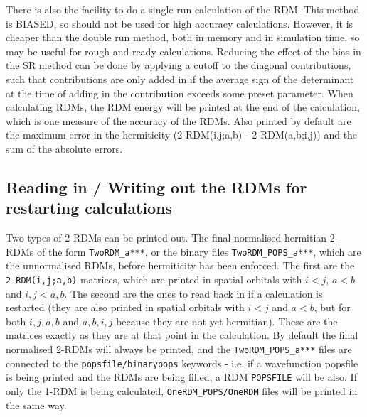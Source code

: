\documentclass[a4paper,notitlepage]{scrreprt}
\let\code\lstinline
\begin{document}
There is also the facility to do a single-run calculation of the RDM.  This method is BIASED, so should
not be used for high accuracy calculations.  However, it is cheaper than the double run method, both in
memory and in simulation time, so may be useful for rough-and-ready calculations.
Reducing the effect of the bias in the SR method can be done by applying a cutoff to the diagonal contributions, such that
contributions are only added in if the average sign of the determinant at the time of adding in the contribution exceeds
some preset parameter.
When calculating RDMs, the RDM energy will be printed at the end of the
calculation, which is one measure of the accuracy of the RDMs.  Also printed by default are the maximum error in the
    hermiticity (2-RDM(i,j;a,b) - 2-RDM(a,b;i,j)) and the sum of the absolute errors.

\subsection{Reading in / Writing out the RDMs for restarting calculations}

	Two types of 2-RDMs can be printed out.  The final normalised hermitian 2-RDMs of the form \code{TwoRDM_a***}, or the
	binary files \code{TwoRDM_POPS_a***}, which are the unnormalised RDMs, before hermiticity has been enforced.  The
	first are the \code{2-RDM(i,j;a,b)} matrices, which are printed in
    spatial orbitals with $i<j$, $a<b$ and $i,j<a,b$.  The second are the ones to read back in if a calculation
    is restarted (they are also printed in spatial orbitals with $i<j$ and $a<b$, but for both $i,j,a,b$ and $a,b,i,j$
    because they are not yet hermitian).  These are the matrices exactly as they are at that point in the calculation.
	By default the final normalised 2-RDMs will always be printed, and the \code{TwoRDM_POPS_a***} files are connected to the
    \code{popsfile/binarypops} keywords - i.e. if a wavefunction popsfile is being printed and the RDMs are being filled,
	a RDM \code{POPSFILE} will be also.
	If only the 1-RDM is being calculated, \code{OneRDM_POPS/OneRDM} files will be printed in the same way.
\end{document}
